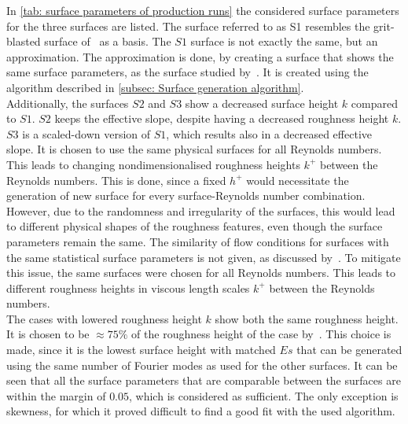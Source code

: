 In \autoref{tab: surface parameters of production runs} the considered surface parameters for the three surfaces are listed.
The surface referred to as S1 resembles the grit-blasted surface of~\cite{demaioDirectNumericalSimulation2023} as a basis.
The $S1$ surface is not exactly the same, but an approximation.
The approximation is done, by creating a surface that shows the same surface parameters, as the surface studied by~\cite{demaioDirectNumericalSimulation2023}.
It is created using the algorithm described in \autoref{subsec: Surface generation algorithm}.\\
Additionally, the surfaces $S2$ and $S3$ show a decreased surface height $k$ compared to $S1$.
$S2$ keeps the effective slope, despite having a decreased roughness height $k$.
$S3$ is a scaled-down version of $S1$, which results also in a decreased effective slope.
It is chosen to use the same physical surfaces for all Reynolds numbers.
This leads to changing nondimensionalised roughness heights $k^+$ between the Reynolds numbers.
This is done, since a fixed $h^+$ would necessitate the generation of new surface for every surface-Reynolds number combination.
However, due to the randomness and irregularity of the surfaces, this would lead to different physical shapes of the roughness features, even though the surface parameters remain the same. 
The similarity of flow conditions for surfaces with the same statistical surface parameters is not given, as discussed by~\cite{forooghiUniversalRoughnessCorrelation2017,chungPredictingDragRough2021}.
To mitigate this issue, the same surfaces were chosen for all Reynolds numbers.
This leads to different roughness heights in viscous length scales $k^+$ between the Reynolds numbers.\\
The cases with lowered roughness height $k$ show both the same roughness height.
It is chosen to be $\approx 75\%$ of the roughness height of the case by~\cite{demaioDirectNumericalSimulation2023}.
This choice is made, since it is the lowest surface height with matched $Es$ that can be generated using the same number of Fourier modes as used for the other surfaces.
It can be seen that all the surface parameters that are comparable between the surfaces are within the margin of $0.05$, which is considered as sufficient.
The only exception is skewness, for which it proved difficult to find a good fit with the used algorithm.
